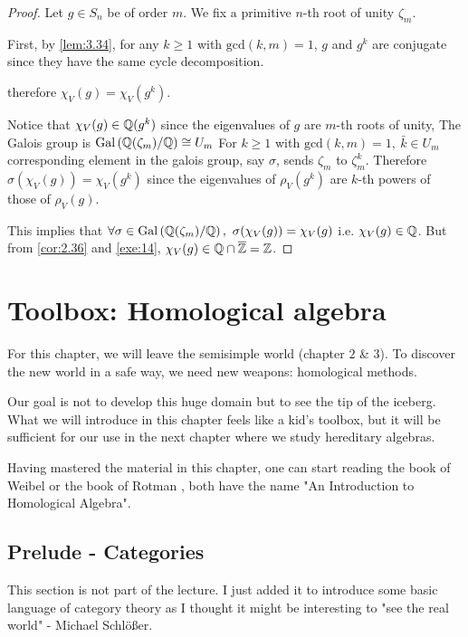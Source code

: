 \documentclass[twoside = false,	%
		headsepline,		%
		parskip = true,
		]{scrbook}						%
\begin{document}
        \begin{proof}
            Let $g\in S_n$ be of order $m$. We fix a primitive $n$-th root of unity $\zeta_m$.

            First, by \ref{lem:3.34}, for any $k\geq 1$ with $\text{gcd}(k,m)=1$, $g$ and $g^k$ are conjugate since they have the same cycle decomposition.

            therefore $\chi_V(g) = \chi_V(g^k)$.

            Notice that $\chi_V(g)\in\mathbb Q(g^k)$ since the eigenvalues of $g$ are $m$-th roots of unity, The Galois group is $\mathrm{Gal}\left( \mathbb Q(\zeta_m)/\mathbb Q\right) \cong U_m$ For $k\geq 1$ with $\text{gcd}(k,m)=1,\ \bar k\in U_m$ corresponding element in the galois group, say $\sigma$, sends $\zeta_m$ to $\zeta_m^k$. Therefore $\sigma(\chi_V(g))=\chi_V(g^k)$ since the eigenvalues of $\rho_V(g^k)$ are $k$-th powers of those of $\rho_V(g)$.

            This implies that $\forall \sigma \in \mathrm{Gal}\left( \mathbb Q(\zeta_m)/\mathbb Q\right),\ \sigma(\chi_V(g)) = \chi_V(g)$ i.e. $\chi_V(g) \in \mathbb Q$. But from \ref{cor:2.36} and \ref{exe:14}, $\chi_V(g)\in\mathbb Q\cap\overline{\mathbb Z} = \mathbb Z$.
        \end{proof}
        
\chapter{Toolbox: Homological algebra}
    For this chapter, we will leave the semisimple world (chapter $2$ \& $3$). To discover the new world in a safe way, we need new weapons: homological methods.
    
    Our goal is not to develop this huge domain but to see the tip of the iceberg. What we will introduce in this chapter feels like a kid's toolbox, but it will be sufficient for our use in the next chapter where we study hereditary algebras.

    Having mastered the material in this chapter, one can start reading the book of Weibel \cite{Weibel.2010} or the book of Rotman \cite{Rotman.2009}, both have the name "An Introduction to Homological Algebra".
\setcounter{section}{-1}
\section{Prelude - Categories}\label{cat}
    This section is not part of the lecture. I just added it to introduce some basic language of category theory as I thought it might be interesting to "see the real world" - Michael Schlößer.
\end{document}
